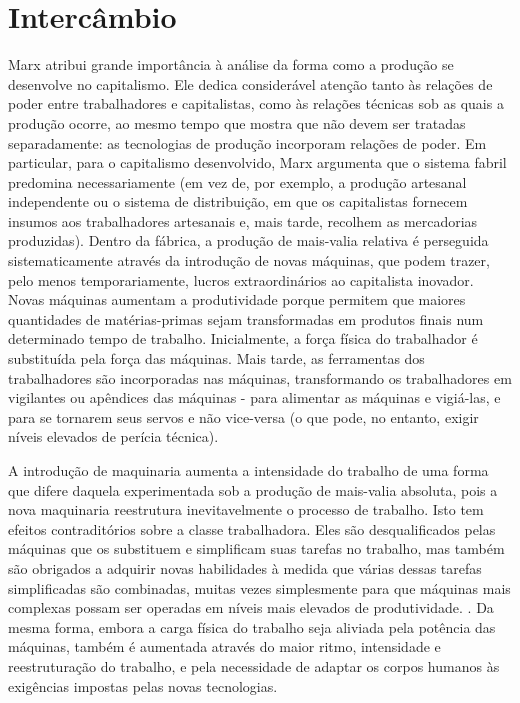 \section{Intercâmbio}
 \par 
Marx atribui grande importância à análise da forma como a produção se desenvolve no capitalismo. Ele dedica considerável atenção tanto às relações de poder entre trabalhadores e capitalistas, como às relações técnicas sob as quais a produção ocorre, ao mesmo tempo que mostra que não devem ser tratadas separadamente: as tecnologias de produção incorporam relações de poder. Em particular, para o capitalismo desenvolvido, Marx argumenta que o sistema fabril predomina necessariamente (em vez de, por exemplo, a produção artesanal independente ou o sistema de distribuição, em que os capitalistas fornecem insumos aos trabalhadores artesanais e, mais tarde, recolhem as mercadorias produzidas). Dentro da fábrica, a produção de mais-valia relativa é perseguida sistematicamente através da introdução de novas máquinas, que podem trazer, pelo menos temporariamente, lucros extraordinários ao capitalista inovador. Novas máquinas aumentam a produtividade porque permitem que maiores quantidades de matérias-primas sejam transformadas em produtos finais num determinado tempo de trabalho. Inicialmente, a força física do trabalhador é substituída pela força das máquinas. Mais tarde, as ferramentas dos trabalhadores são incorporadas nas máquinas, transformando os trabalhadores em vigilantes ou apêndices das máquinas - para alimentar as máquinas e vigiá-las, e para se tornarem seus servos e não vice-versa (o que pode, no entanto, exigir níveis elevados de perícia técnica).
 \par 
A introdução de maquinaria aumenta a intensidade do trabalho de uma forma que difere daquela experimentada sob a produção de mais-valia absoluta, pois a nova maquinaria reestrutura inevitavelmente o processo de trabalho. Isto tem efeitos contraditórios sobre a classe trabalhadora. Eles são desqualificados pelas máquinas que os substituem e simplificam suas tarefas no trabalho, mas também são obrigados a adquirir novas habilidades à medida que várias dessas tarefas simplificadas são combinadas, muitas vezes simplesmente para que máquinas mais complexas possam ser operadas em níveis mais elevados de produtividade. . Da mesma forma, embora a carga física do trabalho seja aliviada pela potência das máquinas, também é aumentada através do maior ritmo, intensidade e reestruturação do trabalho, e pela necessidade de adaptar os corpos humanos às exigências impostas pelas novas tecnologias.
